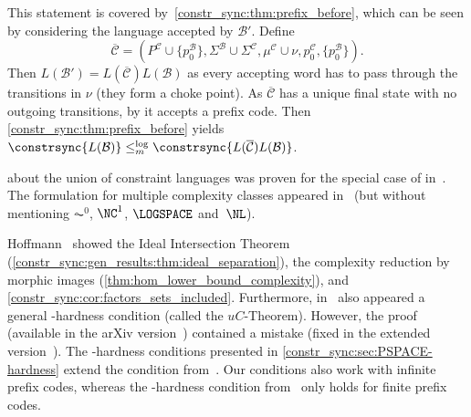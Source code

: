 \begin{enumerate}
	This statement is covered by~\cref{constr_sync:thm:prefix_before}, which can be seen 
	by considering the language accepted by $\mathcal B'$.
	Define 
	\[
	\overline{\mathcal C} = (P^{\mathcal C} \cup \{p_0^{\mathcal B}\}, \Sigma^{\mathcal B} \cup \Sigma^{\mathcal C}, 
	\mu^{\mathcal C} \cup \nu, p_0^{\mathcal C}, \{p_0^{\mathcal B}\}).
	\]
	Then $L(\mathcal B') = L(\overline{ \mathcal C})  L(\mathcal B)$
	as 
	every accepting word has to pass through the transitions in $\nu$ (they form a choke point).
	As $\overline{\mathcal C}$ has a unique final state with no outgoing transitions,
	by  
	it accepts a prefix code.
	Then \cref{constr_sync:thm:prefix_before} 
	yields $\constrsync{L(\mathcal B)} \leq_m^{\log} \constrsync{L(\overline{ \mathcal C})  L(\mathcal B)}$.
\end{enumerate} 

 about the union of constraint languages
was proven for the special case of \PTIME in~\cite[Lem.~13]{FernauGHHVW19}.
The formulation for multiple complexity classes 
appeared in~\cite[Lem.~7]{DBLP:journals/tcs/Hoffmann21} (but without mentioning $\AC^0$, $\NC^1$, $\LOGSPACE$ and~$\NL$).

Hoffmann~\cite{DBLP:conf/cocoon/Hoffmann21} 
showed the Ideal Intersection Theorem (\cref{constr_sync:gen_results:thm:ideal_separation}),
the complexity reduction by morphic images (\cref{thm:hom_lower_bound_complexity}),
and \cref{constr_sync:cor:factors_sets_included}.
Furthermore, in~\cite[Thm.~4.5]{DBLP:conf/cocoon/Hoffmann21} also appeared  a general \PSPACE-hardness condition
(called the $uC$-Theorem).
However, the proof (available in the arXiv version~\cite{DBLP:journals/corr/abs-2005-05907}) 
contained a mistake (fixed in the extended version~\cite{HoffmannCocoonExtended}).
The \PSPACE-hardness conditions presented in \cref{constr_sync:sec:PSPACE-hardness}
extend the condition from~\cite{DBLP:conf/cocoon/Hoffmann21}.
Our conditions also work with infinite prefix codes, whereas
the \PSPACE-hardness condition from~\cite{DBLP:conf/cocoon/Hoffmann21} only holds for finite prefix codes.

